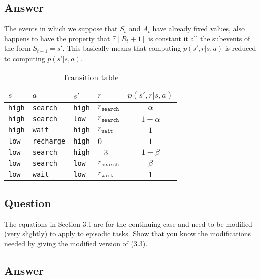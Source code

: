 \documentclass[11pt]{article}
\begin{document}
    \subsection*{Answer}

    The events in which we suppose that $S_t$ and $A_t$ have already fixed values, also happens to have the property that $\mathbb{E}[R_t+1]$ is constant it all the subevents of the form $S_{t+1}=s'$. This basically means that computing $p(s',r|s,a)$ is reduced to computing $p(s'|s,a)$.

    \begin{table}[h!]
        \centering
        \begin{tabular}{ll|ll|c}
            $s$ & $a$ & $s'$ & $r$ & $p(s', r | s, a)$ \\
            \hline
             \texttt{high}& \texttt{search}&  \texttt{high}&  $r_{\texttt{search}}$& $\alpha$  \\
             \texttt{high}& \texttt{search}&  \texttt{low}&   $r_{\texttt{search}}$& $1 - \alpha$ \\
             \texttt{high}& \texttt{wait}&  \texttt{high}&   $r_{\texttt{wait}}$&  $1$ \\
             \texttt{low}& \texttt{recharge}&   \texttt{high}&    $0$&   $1$\\
             \texttt{low}& \texttt{search}&  \texttt{high}&  $-3$& $1 - \beta$  \\
             \texttt{low}& \texttt{search}&  \texttt{low}&   $r_{\texttt{search}}$& $\beta $\\
             \texttt{low}& \texttt{wait}&  \texttt{low}&   $r_{\texttt{wait}}$&  $1$
        \end{tabular}
        
        
        \caption{Transition table}
        \end{table}
        
    \subsection{Question}

    The equations in Section 3.1 are for the continuing case and need to be modified (very slightly) to apply to episodic tasks.
    Show that you know the modifications needed by giving the modified version of (3.3).

    \subsection*{Answer}
\end{document}
